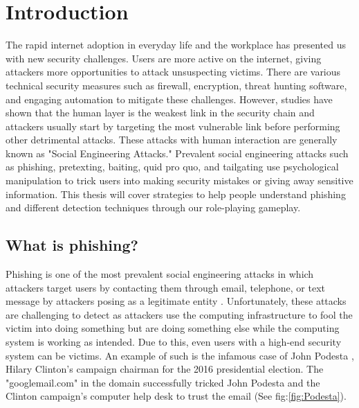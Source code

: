 

\pagestyle{plain} %
\setcounter{page}{1}


\chapter{Introduction}
The rapid internet adoption in everyday life and the workplace has presented us with new security challenges. Users are more active on the internet, giving attackers more opportunities to attack unsuspecting victims. There are various technical security measures such as firewall, encryption, threat hunting software, and engaging automation to mitigate these challenges. However, studies have shown that the human layer is the weakest link in the security chain \cite{jampen} and attackers usually start by targeting the most vulnerable link before performing other detrimental attacks. These attacks with human interaction are generally known as "Social Engineering Attacks." Prevalent social engineering attacks such as phishing, pretexting, baiting, quid pro quo, and tailgating use psychological manipulation to trick users into making security mistakes or giving away sensitive information. This thesis will cover strategies to help people understand phishing and different detection techniques through our role-playing gameplay.

\section{What is phishing?}
Phishing is one of the most prevalent social engineering attacks in which attackers target users by contacting them through email, telephone, or text message by attackers posing as a legitimate entity \cite{phishing, apwg}. Unfortunately, these attacks are challenging to detect as attackers use the computing infrastructure to fool the victim into doing something but are doing something else while the computing system is working as intended. Due to this, even users with a high-end security system can be victims. An example of such is the infamous case of John Podesta \cite{Podesta}, Hilary Clinton's campaign chairman for the 2016 presidential election. The "googlemail.com" in the domain successfully tricked John Podesta and the Clinton campaign's computer help desk to trust the email (See fig:\ref{fig:Podesta}).

